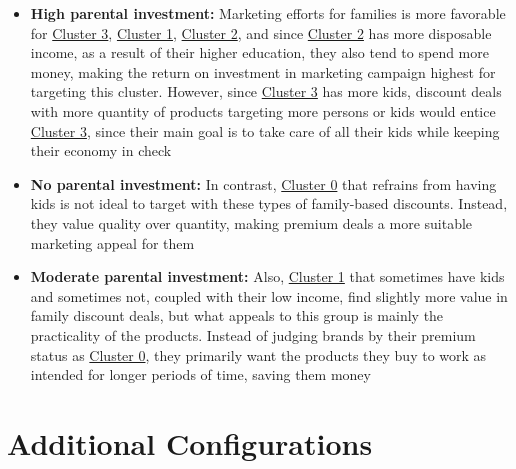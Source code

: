\documentclass[11pt]{article}
\begin{document}
\vspace{1\baselineskip}
\begin{itemize}
	\item \textbf{High parental investment:} Marketing efforts for families is more favorable for \uline{\textcolor[HTML]{674EA7}{Cluster 3}}, \uline{\textcolor[HTML]{0B5394}{Cluster 1}}, \uline{\textcolor[HTML]{38761D}{Cluster 2}}, and since \uline{\textcolor[HTML]{38761D}{Cluster 2}} has more disposable income, as a result of their higher education, they also tend to spend more money, making the return on investment in marketing campaign highest for targeting this cluster. However, since \uline{\textcolor[HTML]{674EA7}{Cluster 3}} has more kids, discount deals with more quantity of products targeting more persons or kids would entice \uline{\textcolor[HTML]{674EA7}{Cluster 3}}, since their main goal is to take care of all their kids while keeping their economy in check

\end{itemize}
\vspace{1\baselineskip}
\begin{itemize}
	\item \textbf{No parental investment:} In contrast, \uline{\textcolor[HTML]{BF9000}{Cluster 0}} that refrains from having kids is not ideal to target with these types of family-based discounts. Instead, they value quality over quantity, making premium deals a more suitable marketing appeal for them

\end{itemize}
\vspace{1\baselineskip}
\begin{itemize}
	\item \textbf{Moderate parental investment:} Also, \uline{\textcolor[HTML]{0B5394}{Cluster 1}} that sometimes have kids and sometimes not, coupled with their low income, find slightly more value in family discount deals, but what appeals to this group is mainly the practicality of the products. Instead of judging brands by their premium status as \uline{\textcolor[HTML]{BF9000}{Cluster 0}}, they primarily want the products they buy to work as intended for longer periods of time, saving them money

\end{itemize}
\vspace{1\baselineskip}
\section{Additional Configurations}
\end{document}
